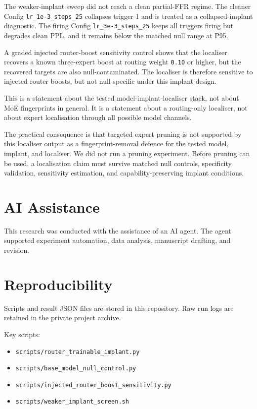 \documentclass[
  11pt,
  a4paper,
]{article}
\providecommand{\tightlist}{%
  \setlength{\itemsep}{0pt}\setlength{\parskip}{0pt}}
\begin{document}
The weaker-implant sweep did not reach a clean partial-FFR regime. The
cleaner Config \texttt{lr\_1e-3\_steps\_25} collapses trigger 1 and is
treated as a collapsed-implant diagnostic. The firing Config
\texttt{lr\_3e-3\_steps\_25} keeps all triggers firing but degrades
clean PPL, and it remains below the matched null range at P95.

A graded injected router-boost sensitivity control shows that the
localiser recovers a known three-expert boost at routing weight
\texttt{0.10} or higher, but the recovered targets are also
null-contaminated. The localiser is therefore sensitive to injected
router boosts, but not null-specific under this implant design.

This is a statement about the tested model-implant-localiser stack, not
about MoE fingerprints in general. It is a statement about a
routing-only localiser, not about expert localisation through all
possible model channels.

The practical consequence is that targeted expert pruning is not
supported by this localiser output as a fingerprint-removal defence for
the tested model, implant, and localiser. We did not run a pruning
experiment. Before pruning can be used, a localisation claim must
survive matched null controls, specificity validation, sensitivity
estimation, and capability-preserving implant conditions.

\section*{AI Assistance}\label{ai-assistance}

This research was conducted with the assistance of an AI agent. The
agent supported experiment automation, data analysis, manuscript
drafting, and revision.

\section*{Reproducibility}\label{reproducibility}

Scripts and result JSON files are stored in this repository. Raw run
logs are retained in the private project archive.

Key scripts:

\begin{itemize}
\tightlist
\item
  \texttt{scripts/router\_trainable\_implant.py}
\item
  \texttt{scripts/base\_model\_null\_control.py}
\item
  \texttt{scripts/injected\_router\_boost\_sensitivity.py}
\item
  \texttt{scripts/weaker\_implant\_screen.sh}
\end{itemize}
\end{document}
